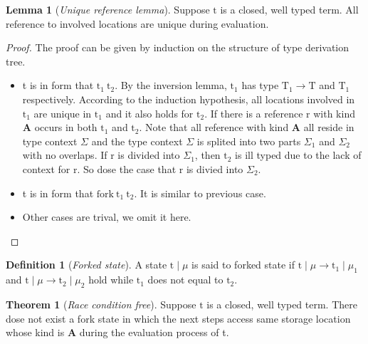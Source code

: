 \documentclass[10pt]{article}
\newcommand{\lto}{\longrightarrow}
\theoremstyle{definition}\newtheorem*{theorem}{Theorem}
\theoremstyle{definition}\newtheorem*{definition}{Definition}
\theoremstyle{definition}\newtheorem*{lemma}{Lemma}
\begin{document}
    \begin{lemma}[{\it Unique reference lemma}]
        Suppose $\mathrm{t}$ is a closed, well typed term. All reference to involved locations are unique during evaluation.
    \end{lemma}
    \begin{proof}
        The proof can be given by induction on the structure of type derivation tree.
        \begin{itemize}
            \item t is in form that $\mathrm{t_1}\ \mathrm{t_2}$. By the inversion lemma, $\mathrm{t_1}$ has type $\mathrm{T_1}\to\mathrm{T}$ and $\mathrm{T_1}$ respectively.
                According to the induction hypothesis, all locations involved in $\mathrm{t_1}$ are unique in $\mathrm{t_1}$ and it also holds for $\mathrm{t_2}$. If there
                is a reference $\mathrm{r}$ with kind $\mathbf{A}$ occurs in both $\mathrm{t_1}$ and $\mathrm{t_2}$. Note that all reference with kind $\mathbf{A}$ all reside in type context $\Sigma$ and the type context $\Sigma$ is splited into two parts $\Sigma_1$ and $\Sigma_2$ with no overlaps.
                If $\mathrm{r}$ is divided into $\Sigma_1$, then $\mathrm{t_2}$ is ill typed due to the lack of context for $\mathrm{r}$. So dose the case that $\mathrm{r}$ is divied into $\Sigma_2$.
            \item t is in form that $\mathrm{fork}\ \mathrm{t_1}\ \mathrm{t_2}$. It is similar to previous case.
            \item Other cases are trival, we omit it here.
        \end{itemize}
    \end{proof}
    \begin{definition}[{\it Forked state}]
        A state $\mathrm{t}\mid\mu$ is said to forked state if $\mathrm{t}\mid\mu\lto\mathrm{t_1}\mid\mu_1$ and $\mathrm{t}\mid\mu\lto\mathrm{t_2}\mid\mu_2$ hold while $\mathrm{t_1}$ does not equal to $\mathrm{t_2}$.
    \end{definition}
    \begin{theorem}[{\it Race condition free}]
        Suppose $\mathrm{t}$ is a closed, well typed term. There dose not exist a fork state in which the next steps access same storage location whose kind is $\mathbf{A}$ during the evaluation process of t.
    \end{theorem}
\end{document}

